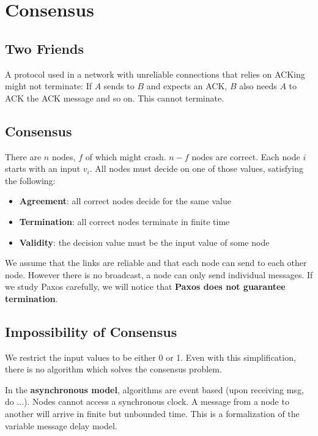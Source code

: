 \section{Consensus}


\subsection{Two Friends}

A protocol used in a network with unreliable connections that relies on ACKing might not terminate: If $A$ sends to $B$ and expects an ACK, $B$ also needs $A$ to ACK the ACK message and so on. This cannot terminate.


\subsection{Consensus}

There are $n$ nodes, $f$ of which might crash. $n-f$ nodes are correct. Each node $i$ starts with an input $v_i$. All nodes must decide on one of those values, satisfying the following:
\begin{itemize}
	\item \textbf{Agreement}: all correct nodes decide for the same value
	\item \textbf{Termination}: all correct nodes terminate in finite time
	\item \textbf{Validity}: the decision value must be the input value of some node
\end{itemize}

We assume that the links are reliable and that each node can send to each other node. However there is no broadcast, a node can only send individual messages. If we study Paxos carefully, we will notice that \textbf{Paxos does not guarantee termination}.


\subsection{Impossibility of Consensus}

We restrict the input values to be either 0 or 1. Even with this simplification, there is no algorithm which solves the consensus problem. \medskip

In the \textbf{asynchronous model}, algorithms are event based (upon receiving msg, do ...). Nodes cannot access a synchronous clock. A message from a node to another will arrive in finite but unbounded time. This is a formalization of the variable message delay model. \medskip

